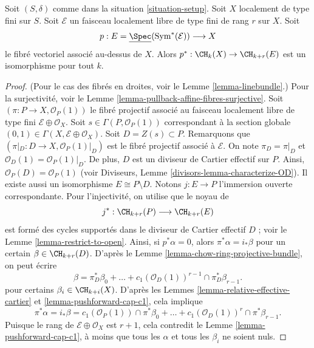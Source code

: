 \begin{lemma}
\label{lemma-vectorbundle}
Soit $(S, \delta)$ comme dans la situation \ref{situation-setup}.
Soit $X$ localement de type fini sur $S$.
Soit $\mathcal{E}$ un faisceau localement libre de type fini de rang $r$ sur $X$.
Soit
$$
p :
E = \underline{\Spec}(\text{Sym}^*(\mathcal{E}))
\longrightarrow
X
$$
le fibré vectoriel associé au-dessus de $X$.
Alors $p^* : \CH_k(X) \to \CH_{k + r}(E)$ est un isomorphisme pour tout $k$.
\end{lemma}

\begin{proof}
(Pour le cas des fibrés en droites, voir le Lemme \ref{lemma-linebundle}.)
Pour la surjectivité, voir le Lemme \ref{lemma-pullback-affine-fibres-surjective}.
Soit $(\pi  : P \to X, \mathcal{O}_P(1))$
le fibré projectif associé
au faisceau localement libre de type fini $\mathcal{E} \oplus \mathcal{O}_X$.
Soit $s \in \Gamma(P, \mathcal{O}_P(1))$ correspondant à la section globale
$(0, 1) \in \Gamma(X, \mathcal{E} \oplus \mathcal{O}_X)$.
Soit $D = Z(s) \subset P$. Remarquons que
$(\pi|_D : D \to X , \mathcal{O}_P(1)|_D)$
est le fibré projectif associé
à $\mathcal{E}$. On note $\pi_D = \pi|_D$ et
$\mathcal{O}_D(1) = \mathcal{O}_P(1)|_D$.
De plus, $D$ est un diviseur de Cartier effectif
sur $P$. Ainsi, $\mathcal{O}_P(D) = \mathcal{O}_P(1)$
(voir Diviseurs, Lemme \ref{divisors-lemma-characterize-OD}).
Il existe aussi un isomorphisme
$E \cong P \setminus D$. Notons $j : E \to P$
l'immersion ouverte correspondante.
Pour l'injectivité, on utilise que le noyau de
$$
j^* :
\CH_{k + r}(P)
\longrightarrow
\CH_{k + r}(E)
$$
est formé des cycles supportés dans le diviseur de Cartier effectif $D$ ;
voir le Lemme \ref{lemma-restrict-to-open}. Ainsi, si $p^*\alpha = 0$, alors
$\pi^*\alpha = i_*\beta$ pour un certain $\beta \in \CH_{k + r}(D)$.
D'après le Lemme \ref{lemma-chow-ring-projective-bundle}, on peut écrire
$$
\beta = \pi_D^*\beta_0 +
\ldots + c_1(\mathcal{O}_D(1))^{r - 1} \cap \pi_D^* \beta_{r - 1}.
$$
pour certains $\beta_i \in \CH_{k + i}(X)$.
D'après les Lemmes \ref{lemma-relative-effective-cartier}
et \ref{lemma-pushforward-cap-c1},
cela implique
$$
\pi^*\alpha = i_*\beta =
c_1(\mathcal{O}_P(1)) \cap \pi^*\beta_0 +
\ldots +
c_1(\mathcal{O}_D(1))^r \cap \pi^*\beta_{r - 1}.
$$
Puisque le rang de $\mathcal{E} \oplus \mathcal{O}_X$ est $r + 1$,
cela contredit le Lemme \ref{lemma-pushforward-cap-c1}, à moins que tous les
$\alpha$ et tous les $\beta_i$ ne soient nuls.
\end{proof}








